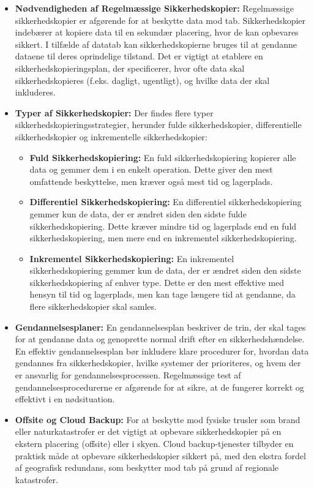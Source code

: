 \begin{itemize}
	\item \textbf{Nødvendigheden af Regelmæssige Sikkerhedskopier:} Regelmæssige sikkerhedskopier er afgørende for at beskytte data mod tab. Sikkerhedskopier indebærer at kopiere data til en sekundær placering, hvor de kan opbevares sikkert. I tilfælde af datatab kan sikkerhedskopierne bruges til at gendanne dataene til deres oprindelige tilstand. Det er vigtigt at etablere en sikkerhedskopieringsplan, der specificerer, hvor ofte data skal sikkerhedskopieres (f.eks. dagligt, ugentligt), og hvilke data der skal inkluderes. 
	
	\item \textbf{Typer af Sikkerhedskopier:} Der findes flere typer sikkerhedskopieringsstrategier, herunder fulde sikkerhedskopier, differentielle sikkerhedskopier og inkrementelle sikkerhedskopier:
	\begin{itemize}
		\item \textbf{Fuld Sikkerhedskopiering:} En fuld sikkerhedskopiering kopierer alle data og gemmer dem i en enkelt operation. Dette giver den mest omfattende beskyttelse, men kræver også mest tid og lagerplads.
		\item \textbf{Differentiel Sikkerhedskopiering:} En differentiel sikkerhedskopiering gemmer kun de data, der er ændret siden den sidste fulde sikkerhedskopiering. Dette kræver mindre tid og lagerplads end en fuld sikkerhedskopiering, men mere end en inkrementel sikkerhedskopiering.
		\item \textbf{Inkrementel Sikkerhedskopiering:} En inkrementel sikkerhedskopiering gemmer kun de data, der er ændret siden den sidste sikkerhedskopiering af enhver type. Dette er den mest effektive med hensyn til tid og lagerplads, men kan tage længere tid at gendanne, da flere sikkerhedskopier skal samles.
	\end{itemize}
	
	\item \textbf{Gendannelsesplaner:} En gendannelsesplan beskriver de trin, der skal tages for at gendanne data og genoprette normal drift efter en sikkerhedshændelse. En effektiv gendannelsesplan bør inkludere klare procedurer for, hvordan data gendannes fra sikkerhedskopier, hvilke systemer der prioriteres, og hvem der er ansvarlig for gendannelsesprocessen. Regelmæssige test af gendannelsesprocedurerne er afgørende for at sikre, at de fungerer korrekt og effektivt i en nødsituation.
	
	\item \textbf{Offsite og Cloud Backup:} For at beskytte mod fysiske trusler som brand eller naturkatastrofer er det vigtigt at opbevare sikkerhedskopier på en ekstern placering (offsite) eller i skyen. Cloud backup-tjenester tilbyder en praktisk måde at opbevare sikkerhedskopier sikkert på, med den ekstra fordel af geografisk redundans, som beskytter mod tab på grund af regionale katastrofer.
	

\end{itemize}
